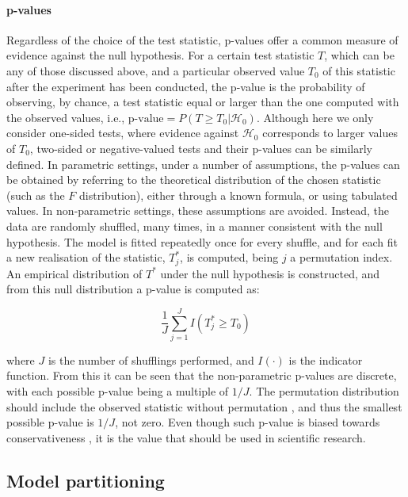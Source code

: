 \paragraph{p-values} Regardless of the choice of the test statistic, p-values offer a common measure of evidence against the null hypothesis. For a certain test statistic $T$, which can be any of those discussed above, and a particular observed value $T_{0}$ of this statistic after the experiment has been conducted, the p-value is the probability of observing, by chance, a test statistic equal or larger than the one computed with the observed values, i.e., $\text{p-value}=P(T \geqslant T_{0} | \mathcal{H}_{0})$. Although here we only consider one-sided tests, where evidence against $\mathcal{H}_{0}$ corresponds to larger values of $T_{0}$, two-sided or negative-valued tests and their p-values can be similarly defined. In parametric settings, under a number of assumptions, the p-values can be obtained by referring to the theoretical distribution of the chosen statistic (such as the $F$ distribution), either through a known formula, or using tabulated values. In non-parametric settings, these assumptions are avoided. Instead, the data are randomly shuffled, many times, in a manner consistent with the null hypothesis. The model is fitted repeatedly once for every shuffle, and for each fit a new realisation of the statistic, $T_{j}^{*}$, is computed, being $j$ a permutation index. An empirical distribution of $T^{*}$ under the null hypothesis is constructed, and from this null distribution a p-value is computed as:

\begin{equation}
\frac{1}{J}\sum_{j=1}^{J}I(T^{*}_j \geqslant T_{0})
\end{equation}

\noident
where $J$ is the number of shufflings performed, and $I(\cdot)$ is the indicator function. From this it can be seen that the non-parametric p-values are discrete, with each possible p-value being a multiple of $1/J$. The permutation distribution should include the observed statistic without permutation \citep{Edgington1969, Phipson2010}, and thus the smallest possible p-value is $1/J$, not zero. Even though such p-value is biased towards conservativeness \citep{Pesarin2010}, it is the value that should be used in scientific research.

\subsection{Model partitioning}
\label{sec:perm:partitioning}

